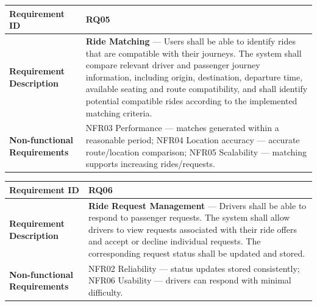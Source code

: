 \begin{minipage}{\textwidth}
\small
\begin{tabular}{|>{\raggedright\arraybackslash}p{}|>{\raggedright\arraybackslash}p{}|}
\hline
\textbf{Requirement ID} & RQ05 \\
\hline
\textbf{Requirement Description} & \textbf{Ride Matching} --- Users shall be able to identify rides that are compatible with their journeys. The system shall compare relevant driver and passenger journey information, including origin, destination, departure time, available seating and route compatibility, and shall identify potential compatible rides according to the implemented matching criteria. \\
\hline
\textbf{Non-functional Requirements} & NFR03 Performance --- matches generated within a reasonable period; \newline NFR04 Location accuracy --- accurate route/location comparison; \newline NFR05 Scalability --- matching supports increasing rides/requests. \\
\hline
\end{tabular}
\end{minipage}
\medskip
 
\begin{minipage}{\textwidth}
\small
\begin{tabular}{|>{\raggedright\arraybackslash}p{}|>{\raggedright\arraybackslash}p{}|}
\hline
\textbf{Requirement ID} & RQ06 \\
\hline
\textbf{Requirement Description} & \textbf{Ride Request Management} --- Drivers shall be able to respond to passenger requests. The system shall allow drivers to view requests associated with their ride offers and accept or decline individual requests. The corresponding request status shall be updated and stored. \\
\hline
\textbf{Non-functional Requirements} & NFR02 Reliability --- status updates stored consistently; \newline NFR06 Usability --- drivers can respond with minimal difficulty. \\
\hline
\end{tabular}
\end{minipage}
\medskip
 
